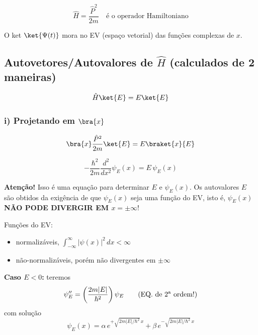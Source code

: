\begin{equation}
    \hat{H} = \frac{\hat{P}^2}{2m} \quad \text{é o operador Hamiltoniano}
\label{eq:aula14_hamiltoniano_op}
\end{equation}

O ket $\ket{\Psi(t)}$ mora no EV (espaço vetorial) das funções complexas de $x$.

\subsection*{Autovetores/Autovalores de $\hat{H}$ (calculados de 2 maneiras)}

\begin{equation}
    \hat{H}\ket{E} = E\ket{E}
\label{eq:aula14_autovalor_H}
\end{equation}

\subsubsection*{i) Projetando em $\bra{x}$}

\begin{equation}
    \bra{x}\frac{\hat{P}^2}{2m}\ket{E} = E\braket{x}{E}
\label{eq:aula14_projetando_x}
\end{equation}

\begin{equation}
    -\frac{\hbar^2}{2m}\frac{d^2}{dx^2}\psi_E(x) = E\,\psi_E(x)
\label{eq:aula14_eq_diferencial_E}
\end{equation}

\textbf{Atenção!} Isso é uma equação para determinar $E$ e $\psi_E(x)$. Os autovalores $E$ são obtidos da exigência de que $\psi_E(x)$ seja uma função do EV, isto é, $\psi_E(x)$ \textbf{NÃO PODE DIVERGIR EM $x = \pm\infty$}!

Funções do EV:
\begin{itemize}
    \item[(i)] normalizáveis, $\displaystyle\int_{-\infty}^{\infty} |\psi(x)|^2\, dx < \infty$
    \item[(ii)] não-normalizáveis, porém não divergentes em $\pm\infty$
\end{itemize}

\textbf{Caso $E < 0$:} teremos
\begin{equation}
    \psi_E'' = \left(\frac{2m|E|}{\hbar^2}\right)\psi_E \qquad \text{(EQ. de 2\textsuperscript{a} ordem!)}
\label{eq:aula14_eq_E_negativo}
\end{equation}
com solução
\begin{equation}
    \psi_E(x) = \alpha\, e^{+\sqrt{2m|E|/\hbar^2}\,x} + \beta\, e^{-\sqrt{2m|E|/\hbar^2}\,x}
\label{eq:aula14_solucao_E_negativo}
\end{equation}

